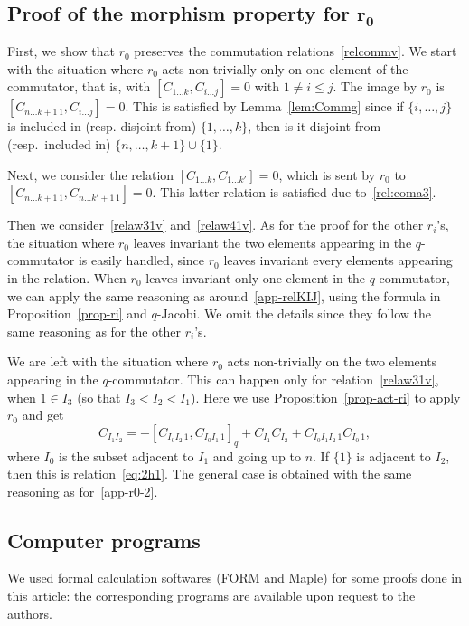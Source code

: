 \documentclass[10pt,a4paper]{amsart}
\numberwithin{equation}{section}
\theoremstyle{definition}
\begin{document}
\subsection[Proof of the morphism property for r\_0]{Proof of the morphism property for $\boldsymbol{r_0}$} First, we show that $r_0$ preserves the commutation relations~\eqref{relcommv}. We start with the situation where $r_0$ acts non-trivially only on one element of the commutator, that is, with ${[C_{1\dots k},C_{i\dots j}]=0}$ with $1\neq i\leq j$. The image by $r_0$ is ${[C_{n\dots k+1\, 1},C_{i\dots j}]=0}$. This is satisfied by Lemma~\ref{lem:Commg} since if $\{i,\dots,j\}$ is included in (resp. disjoint from) $\{1,\dots,k\}$, then is it disjoint from (resp.\ included in) $\{n,\dots,k+1\}\cup\{1\}$.

Next, we consider the relation $[C_{1\dots k},\!C_{1\dots k'}]\!=\!0$, which is sent by $r_0$ to ${[C_{n\dots k+1\,1},\!C_{n\dots k'+1\,1}]\!=\!0}$. This latter relation is satisfied due to~\eqref{rel:coma3}.

Then we consider~\eqref{relaw31v} and~\eqref{relaw41v}. As for the proof for the other $r_i$'s, the situation where $r_0$ leaves invariant the two elements appearing in the $q$-commutator is easily handled, since $r_0$ leaves invariant every elements appearing in the relation. When $r_0$ leaves invariant only one element in the $q$-commutator, we can apply the same reasoning as around~\eqref{app-relKIJ}, using the formula in Proposition~\ref{prop-ri} and $q$-Jacobi. We omit the details since they follow the same reasoning as for the other $r_i$'s.

We are left with the situation where $r_0$ acts non-trivially on the two elements appearing in the $q$-commutator. This can happen only for relation~\eqref{relaw31v}, when $1\in I_3$ (so that $I_3<I_2<I_1$). Here we use Proposition~\ref{prop-act-ri} to apply $r_0$ and get
\[C_{I_1I_2}=-[C_{I_0I_2\,1},C_{I_0I_1\,1}]_q+C_{I_1}C_{I_2}+C_{I_0I_1I_2\,1}C_{I_0\,1} ,\]
where $I_0$ is the subset adjacent to $I_1$ and going up to $n$. If $\{1\}$ is adjacent to $I_2$, then this is relation~\eqref{eq:2h1}. The general case is obtained with the same reasoning as for~\eqref{app-r0-2}.

\subsection*{Computer programs}
We used formal calculation softwares (FORM and Maple) for some proofs done in this article: the corresponding programs are available upon request to the authors.
\end{document}
